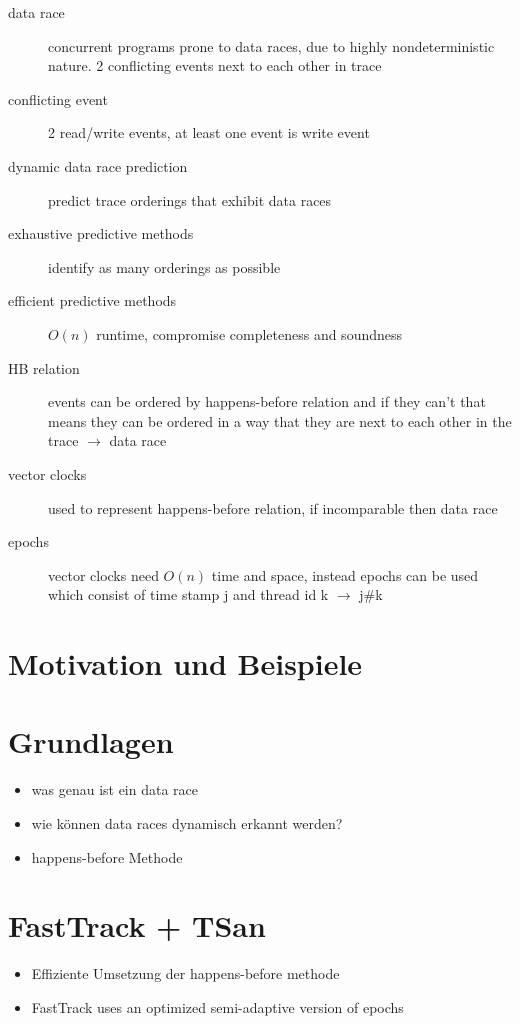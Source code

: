 \documentclass[12pt]{article}
\begin{document}
	\begin{description}
		\item[data race] concurrent programs prone to data races, due to highly nondeterministic nature. 2 conflicting events next to each other in trace
		\item[conflicting event] 2 read/write events, at least one event is write event
		\item[dynamic data race prediction] predict trace orderings that exhibit data races
		\item[exhaustive predictive methods] identify as many orderings as possible
		\item[efficient predictive methods] \(O(n)\) runtime, compromise completeness and soundness
		\item[HB relation] events can be ordered by happens-before relation and if they can't that means they can be ordered in a way that they are next to each other in the trace $\rightarrow$ data race
		\item[vector clocks] used to represent happens-before relation, if incomparable then data race
		\item[epochs] vector clocks need \(O(n)\) time and space, instead epochs can be used which consist of time stamp j and thread id k $\rightarrow$ j\#k
	\end{description}

	\section{Motivation und Beispiele}
	
	\section{Grundlagen}
		\begin{itemize}
			\item was genau ist ein data race
			\item wie k\"onnen data races dynamisch erkannt werden?
			\item happens-before Methode
		\end{itemize}
	
	\section{FastTrack + TSan}
	\begin{itemize}
		\item Effiziente Umsetzung der happens-before methode
		\item FastTrack uses an optimized semi-adaptive version of epochs
	\end{itemize} \cite{cormac} \cite{sulzmann}
	
\end{document}
